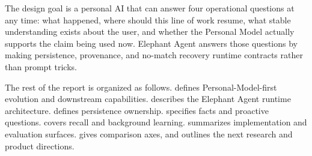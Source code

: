 The design goal is a personal AI that can answer four operational questions at
any time: what happened, where should this line of work resume, what stable
understanding exists about the user, and whether the Personal Model actually
supports the claim being used now. Elephant Agent answers those questions by making
persistence, provenance, and no-match recovery runtime contracts rather than
prompt tricks.

The rest of the report is organized as follows. 
defines Personal-Model-first evolution and downstream capabilities.
 describes the Elephant Agent runtime architecture.
 defines persistence ownership.
 specifies facts and proactive questions.
 covers recall and background learning.
 summarizes implementation and evaluation
surfaces.  gives comparison axes, and
 outlines the next research and product directions.
